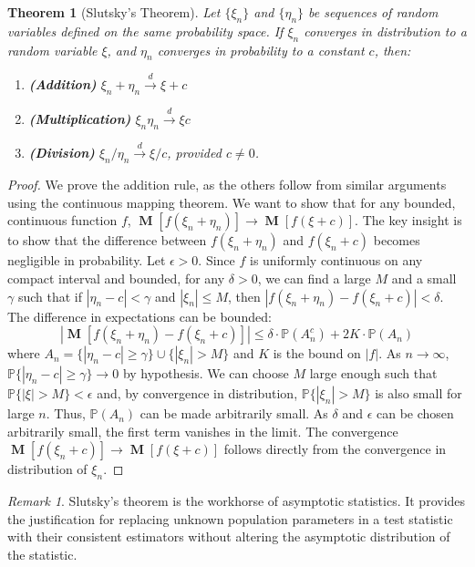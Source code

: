 \documentclass[12pt, openany]{book}
\theoremstyle{definition}
\theoremstyle{plain}
\newtheorem{theorem}[definition]{Theorem}
\theoremstyle{remark}
\newtheorem{remark}[definition]{Remark}
\newcommand{\probP}{\mathbb{P}}
\DeclareMathOperator{\E}{\mathbf{M}} %
\begin{document}
\begin{theorem}[Slutsky's Theorem]
Let $\{\xi_n\}$ and $\{\eta_n\}$ be sequences of random variables defined on the same probability space. If $\xi_n$ converges in distribution to a random variable $\xi$, and $\eta_n$ converges in probability to a constant $c$, then:
\begin{enumerate}
    \item \textbf{(Addition)} $\xi_n + \eta_n \xrightarrow{d} \xi + c$
    \item \textbf{(Multiplication)} $\xi_n \eta_n \xrightarrow{d} \xi c$
    \item \textbf{(Division)} $\xi_n / \eta_n \xrightarrow{d} \xi / c$, provided $c \neq 0$.
\end{enumerate}
\end{theorem}
\begin{proof}
We prove the addition rule, as the others follow from similar arguments using the continuous mapping theorem. We want to show that for any bounded, continuous function $f$, $\E[f(\xi_n + \eta_n)] \to \E[f(\xi+c)]$.
The key insight is to show that the difference between $f(\xi_n + \eta_n)$ and $f(\xi_n+c)$ becomes negligible in probability. Let $\epsilon > 0$. Since $f$ is uniformly continuous on any compact interval and bounded, for any $\delta > 0$, we can find a large $M$ and a small $\gamma$ such that if $|\eta_n-c| < \gamma$ and $|\xi_n| \le M$, then $|f(\xi_n+\eta_n) - f(\xi_n+c)| < \delta$.
The difference in expectations can be bounded:
$$ |\E[f(\xi_n + \eta_n) - f(\xi_n+c)]| \le \delta \cdot \probP(A_n^c) + 2K \cdot \probP(A_n) $$
where $A_n = \{|\eta_n-c| \ge \gamma\} \cup \{|\xi_n| > M\}$ and $K$ is the bound on $|f|$. As $n \to \infty$, $\probP\{|\eta_n-c| \ge \gamma\} \to 0$ by hypothesis. We can choose $M$ large enough such that $\probP\{|\xi|>M\} < \epsilon$ and, by convergence in distribution, $\probP\{|\xi_n|>M\}$ is also small for large $n$. Thus, $\probP(A_n)$ can be made arbitrarily small. As $\delta$ and $\epsilon$ can be chosen arbitrarily small, the first term vanishes in the limit. The convergence $\E[f(\xi_n+c)] \to \E[f(\xi+c)]$ follows directly from the convergence in distribution of $\xi_n$.
\end{proof}
\begin{remark}
Slutsky's theorem is the workhorse of asymptotic statistics. It provides the justification for replacing unknown population parameters in a test statistic with their consistent estimators without altering the asymptotic distribution of the statistic.
\end{remark}

\end{document}
